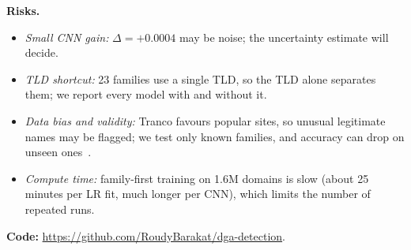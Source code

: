 \documentclass[11pt]{article}
\begin{document}
\textbf{Risks.}
\begin{itemize}
  \item \emph{Small CNN gain:} $\Delta = +0.0004$ may be noise; the uncertainty
  estimate will decide.
  \item \emph{TLD shortcut:} 23 families use a single TLD, so the TLD alone
  separates them; we report every model with and without it.
  \item \emph{Data bias and validity:} Tranco favours popular sites, so unusual
  legitimate names may be flagged; we test only known families, and accuracy can
  drop on unseen ones~\cite{dahal2019autoencoded}.
  \item \emph{Compute time:} family-first training on 1.6M domains is slow (about
  25 minutes per LR fit, much longer per CNN), which limits the number of repeated runs.
\end{itemize}

\textbf{Code:} \url{https://github.com/RoudyBarakat/dga-detection}.



\end{document}
